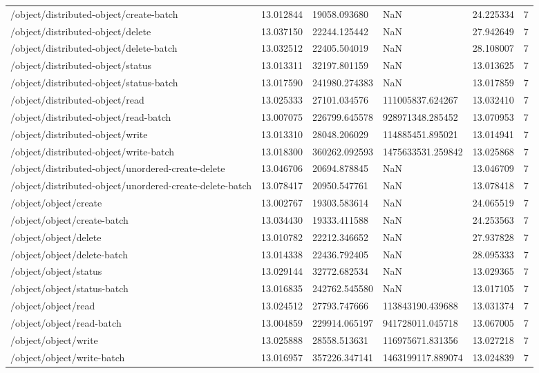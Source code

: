 \begin{tabularx}{\linewidth}{XXXXXX}
/object/distributed-object/create-batch & 13.012844 & 19058.093680 & NaN & 24.225334 & 7 \\
/object/distributed-object/delete & 13.037150 & 22244.125442 & NaN & 27.942649 & 7 \\
/object/distributed-object/delete-batch & 13.032512 & 22405.504019 & NaN & 28.108007 & 7 \\
/object/distributed-object/status & 13.013311 & 32197.801159 & NaN & 13.013625 & 7 \\
/object/distributed-object/status-batch & 13.017590 & 241980.274383 & NaN & 13.017859 & 7 \\
/object/distributed-object/read & 13.025333 & 27101.034576 & 111005837.624267 & 13.032410 & 7 \\
/object/distributed-object/read-batch & 13.007075 & 226799.645578 & 928971348.285452 & 13.070953 & 7 \\
/object/distributed-object/write & 13.013310 & 28048.206029 & 114885451.895021 & 13.014941 & 7 \\
/object/distributed-object/write-batch & 13.018300 & 360262.092593 & 1475633531.259842 & 13.025868 & 7 \\
/object/distributed-object/unordered-create-delete & 13.046706 & 20694.878845 & NaN & 13.046709 & 7 \\
/object/distributed-object/unordered-create-delete-batch & 13.078417 & 20950.547761 & NaN & 13.078418 & 7 \\
/object/object/create & 13.002767 & 19303.583614 & NaN & 24.065519 & 7 \\
/object/object/create-batch & 13.034430 & 19333.411588 & NaN & 24.253563 & 7 \\
/object/object/delete & 13.010782 & 22212.346652 & NaN & 27.937828 & 7 \\
/object/object/delete-batch & 13.014338 & 22436.792405 & NaN & 28.095333 & 7 \\
/object/object/status & 13.029144 & 32772.682534 & NaN & 13.029365 & 7 \\
/object/object/status-batch & 13.016835 & 242762.545580 & NaN & 13.017105 & 7 \\
/object/object/read & 13.024512 & 27793.747666 & 113843190.439688 & 13.031374 & 7 \\
/object/object/read-batch & 13.004859 & 229914.065197 & 941728011.045718 & 13.067005 & 7 \\
/object/object/write & 13.025888 & 28558.513631 & 116975671.831356 & 13.027218 & 7 \\
/object/object/write-batch & 13.016957 & 357226.347141 & 1463199117.889074 & 13.024839 & 7 \\

\end{tabularx}
